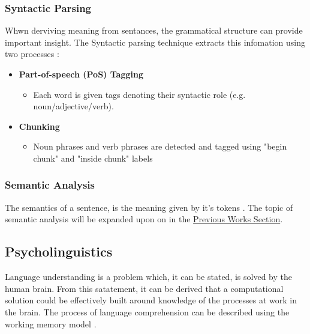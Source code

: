\documentclass[]{article}
\begin{document}
\subsubsection{Syntactic Parsing}
\label{sec:SyntacticParsing}
Whwn derviving meaning from sentances, the grammatical structure can provide important insight. The Syntactic parsing technique extracts this infomation using two processes \cite{NLPAlmostFromScratch}: 
\begin{itemize}
	\item \textbf{Part-of-speech (PoS) Tagging}
	\label{PoSTag}
	\begin{itemize}
		\item Each word is given tags denoting their syntactic role (e.g. noun/adjective/verb).
	\end{itemize}		
	
	\item \textbf{Chunking}
	
	\begin{itemize}
		\item Noun phrases and verb phrases are detected and tagged using "begin chunk" and "inside chunk" labels
	\end{itemize}	
	
\end{itemize}

\subsubsection{Semantic Analysis}
\label{sec:SemanticAnalysis}
The semantics of a sentence, is the meaning given by it's tokens \cite{SemanticAnalysisAPracticalIntro}. The topic of semantic analysis will be expanded upon on in the \hyperref[sec:PrevWork]{Previous Works Section}.



\subsection{Psycholinguistics}
\label{sec:Psycholinguistics}
Language understanding is a problem which, it can be stated, is solved by the human brain. From this satatement, it can be derived that a computational solution could be effectively built around knowledge of the processes at work in the brain. The process of language comprehension can be described using the working memory model \cite{MemoryBaddeleyEysenkAnderson}.
\end{document}

